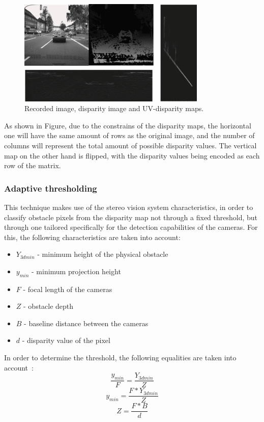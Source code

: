 \begin{figure}[H]
    \includegraphics[width=0.80\textwidth, height=0.45\textwidth]{resources/png/uv_disparity.png}
    \caption{Recorded image, disparity image and UV-disparity maps.~\cite{withMain}~\label{figInit}}
\end{figure}

As shown in Figure, due to the constrains of the disparity maps, the horizontal one will have the same amount
of rows as the original image, and the number of columns will represent the total amount of possible disparity
values. The vertical map on the other hand is flipped, with the disparity values being encoded as each row of
the matrix.

\subsubsection{Adaptive thresholding}

This technique makes use of the stereo vision system characteristics, in order to classify obstacle pixels 
from the disparity map not through a fixed threshold, but through one tailored specifically for the detection
capabilities of the cameras. For this, the following characteristics are taken into account:
\begin{itemize}
    \item \(Y_{3dmin}\) - minimum height of the physical obstacle
    \item \(y_{min}\) - minimum projection height
    \item \(F\) - focal length of the cameras
    \item \(Z\) - obstacle depth
    \item \(B\) - baseline distance between the cameras
    \item \(d\) - disparity value of the pixel
\end{itemize}

In order to determine the threshold, the following equalities are taken into account~\cite{withMain}:
\begin{equation}
    \frac{y_{min}}{F} = \frac{Y_{3dmin}}{Z} 
\end{equation}
\begin{equation}
    y_{min} = \frac{F * Y_{3dmin}}{Z} 
\end{equation}
\begin{equation}
    Z = \frac{F * B}{d} 
\end{equation}

